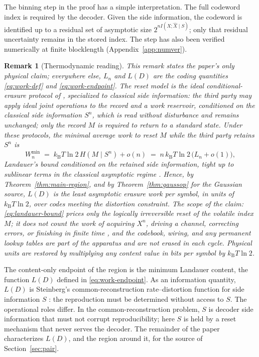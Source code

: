 ﻿\documentclass[11pt,onecolumn]{IEEEtran}
\newtheorem{remark}[theorem]{Remark}
\newcommand{\hX}{\widehat{X}}
\newcommand{\kb}{k_{\mathrm{B}}}
\begin{document}
The binning step in the proof has a simple interpretation. The full codeword
index is required by the decoder. Given the side information, the codeword
is identified up to a residual set of asymptotic size $2^{nI(X;\hX\mid S)}$; only
that residual uncertainty remains in the stored index. The step has also
been verified numerically at finite blocklength
(Appendix~\ref{app:numver}).

\begin{remark}[Thermodynamic reading]\label{rem:thermo}
This remark states the paper's only physical claim; everywhere else,
$L_n$ and $L(D)$ are the coding quantities \eqref{eq:work-def} and
\eqref{eq:work-endpoint}. The reset model is the ideal
conditional-erasure protocol of \cite{delrio2011,faist2015}, specialized
to classical side information: the third party may apply ideal joint
operations to the record and a work reservoir, conditioned on the
classical side information $S^n$, which is read without disturbance and
remains unchanged; only the record $M$ is required to return to a
standard state. Under these protocols, the minimal average work to reset
$M$ while the third party retains $S^n$ is
\begin{equation}
 W_n^{\min}\;=\;\kb T\ln2\,H(M\mid S^n)+o(n)
 \;=\;n\,\kb T\ln2\,\bigl(L_n+o(1)\bigr),
 \label{eq:landauer-bound}
\end{equation}
Landauer's bound \cite{landauer1961} conditioned on the retained side
information, tight up to sublinear terms in the classical asymptotic
regime \cite{delrio2011,faist2015}. Hence, by
Theorem~\ref{thm:main-region}, and by Theorem~\ref{thm:gaussop} for the
Gaussian source, $L(D)$ is the least asymptotic erasure work per symbol,
in units of $\kb T\ln2$, over codes meeting the distortion constraint.
The scope of the claim: \eqref{eq:landauer-bound} prices only the
logically irreversible reset of the volatile index $M$; it does not
count the work of acquiring $X^n$, driving a channel, correcting errors,
or finishing in finite time \cite{landauer1961,bennett1973}, and the
codebook, wiring, and any permanent lookup tables are part of the
apparatus and are not erased in each cycle. Physical units are restored
by multiplying any content value in bits per symbol by $\kb T\ln2$.
\end{remark}

The content-only endpoint of the region is the minimum Landauer content, the
function $L(D)$ defined in \eqref{eq:work-endpoint}.
As an information quantity, $L(D)$ is Steinberg's common-reconstruction
rate--distortion function for side information $S$ \cite{steinberg2009}: the
reproduction must be determined without access to $S$. The operational roles
differ. In the common-reconstruction problem, $S$ is decoder side information
that must not corrupt reproducibility; here $S$ is held by a reset mechanism
that never serves the decoder. The remainder of the paper characterizes
$L(D)$, and the region around it, for the source of Section~\ref{sec:pair}.
\end{document}
